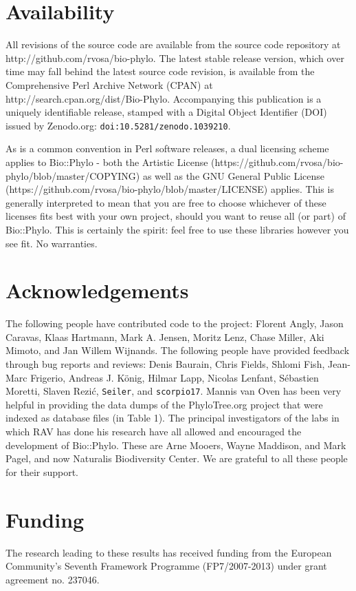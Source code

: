 \documentclass{bioinfo}
\begin{document}
\section{Availability}

All revisions of the source code are available from the source code repository at
http://github.com/rvosa/bio-phylo. The latest stable release version, which over time may
fall behind the latest source code revision, is available from the Comprehensive Perl 
Archive Network (CPAN) at http://search.cpan.org/dist/Bio-Phylo. Accompanying this 
publication is a uniquely identifiable release, stamped with a Digital Object Identifier 
(DOI) issued by Zenodo.org: \texttt{doi:10.5281/zenodo.1039210}.

As is a common convention in Perl software releases, a dual licensing scheme applies to
Bio::Phylo - both the Artistic License 
(https://github.com/rvosa/bio-phylo/blob/master/COPYING) as well as the GNU General Public 
License (https://github.com/rvosa/bio-phylo/blob/master/LICENSE) applies. This is 
generally interpreted to mean that you are free to choose whichever of these licenses fits 
best with your own project, should you want to reuse all (or part) of Bio::Phylo. This is 
certainly the spirit: feel free to use these libraries however you see fit. No warranties.

\section*{Acknowledgements}

The following people have contributed code to the project: Florent Angly, Jason Caravas, 
Klaas Hartmann, Mark A. Jensen, Moritz Lenz, Chase Miller, Aki Mimoto, and Jan Willem 
Wijnands. The following people have provided feedback through bug reports and reviews:
Denis Baurain, Chris Fields, Shlomi Fish, Jean-Marc Frigerio, Andreas J. K\"{o}nig, Hilmar 
Lapp, Nicolas Lenfant, S\'{e}bastien Moretti, Slaven Rezi\'{c}, \texttt{Seiler}, and
\texttt{scorpio17}. Mannis van Oven has been very helpful in providing the data dumps of
the PhyloTree.org project that were indexed as database files (in Table 1). The principal
investigators of the labs in which RAV has done his research have all allowed and 
encouraged the development of Bio::Phylo. These are Arne Mooers, Wayne Maddison, and Mark
Pagel, and now Naturalis Biodiversity Center. We are grateful to all these people for 
their support.

\section*{Funding}

The research leading to these results has received funding from the European Community's 
Seventh Framework Programme (FP7/2007-2013) under grant agreement no. 237046.




\end{document}

